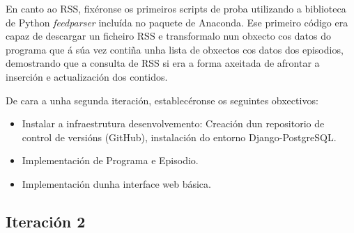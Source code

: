 En canto ao RSS, fixéronse os primeiros scripts de proba utilizando a biblioteca de Python \textit{feedparser} incluída no paquete de Anaconda. Ese primeiro código era capaz de descargar un ficheiro RSS e transformalo nun obxecto cos datos do programa que á súa vez contiña unha lista de obxectos cos datos dos episodios, demostrando que a consulta de RSS si era a forma axeitada de afrontar a inserción e actualización dos contidos.

De cara a unha segunda iteración, establecéronse os seguintes obxectivos:

\begin{itemize}
	\item Instalar a infraestrutura desenvolvemento: Creación dun repositorio de control de versións (GitHub), instalación do entorno Django-PostgreSQL.
	\item Implementación de Programa e Episodio.
	\item Implementación dunha interface web básica.
\end{itemize}

\subsection{Iteración 2}